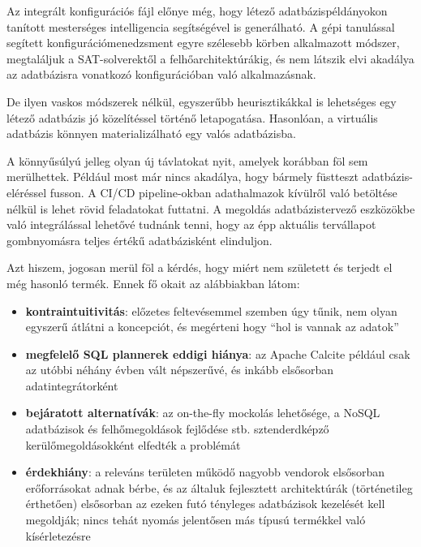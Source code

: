 \documentclass[
    parspace,
    noindent,
    nohyp,
]{elteiktdk}[2023/04/10]
\begin{document}
Az integrált konfigurációs fájl előnye még,
hogy létező adatbázispéldányokon tanított mesterséges intelligencia segítségével is generálható.
A gépi tanulással segített konfigurációmenedzsment egyre szélesebb körben alkalmazott módszer,
megtaláljuk a SAT-solverektől\cite{Hoos2021AutomatedCA} a felhőarchitektúrákig\cite{Osypanka2022ResourceUC},
és nem látszik elvi akadálya az adatbázisra vonatkozó konfigurációban való alkalmazásnak.

De ilyen vaskos módszerek nélkül, egyszerűbb heurisztikákkal is lehetséges
egy létező adatbázis jó közelítéssel történő letapogatása.
Hasonlóan, a virtuális adatbázis könnyen materializálható egy valós adatbázisba.

A könnyűsúlyú jelleg olyan új távlatokat nyit, amelyek korábban föl sem merülhettek.
Például most már nincs akadálya, hogy bármely füstteszt adatbázis-eléréssel fusson.
A CI/CD pipeline-okban adathalmazok kívülről való betöltése nélkül is lehet rövid feladatokat futtatni.
A megoldás adatbázistervező eszközökbe való integrálással lehetővé tudnánk tenni,
hogy az épp aktuális tervállapot gombnyomásra teljes értékű adatbázisként elinduljon.

Azt hiszem, jogosan merül föl a kérdés, hogy miért nem született és terjedt el még hasonló termék.
Ennek fő okait az alábbiakban látom:

\begin{itemize}
    \item \textbf{kontraintuitivitás}: előzetes feltevésemmel szemben úgy tűnik,
          nem olyan egyszerű átlátni a koncepciót, és megérteni hogy ``hol is vannak az adatok''
    \item \textbf{megfelelő SQL plannerek eddigi hiánya}: az Apache Calcite például
          csak az utóbbi néhány évben vált népszerűvé, és inkább elsősorban adatintegrátorként
    \item \textbf{bejáratott alternatívák}: az on-the-fly mockolás lehetősége,
          a NoSQL adatbázisok és felhőmegoldások fejlődése stb.
          sztenderdképző kerülőmegoldásokként elfedték a problémát
    \item \textbf{érdekhiány}: a releváns területen működő nagyobb vendorok elsősorban
          erőforrásokat adnak bérbe, és az általuk fejlesztett architektúrák (történetileg érthetően)
          elsősorban az ezeken futó tényleges adatbázisok kezelését kell megoldják;
          nincs tehát nyomás jelentősen más típusú termékkel való kísérletezésre
\end{itemize}
\end{document}

